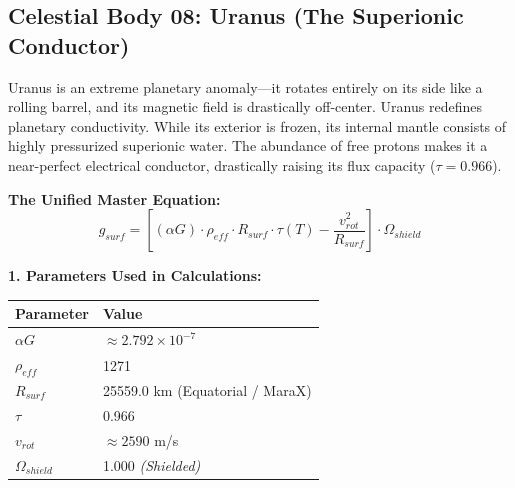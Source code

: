 \documentclass[11pt, a4paper]{article}
\begin{document}
\clearpage
\subsection{Celestial Body 08: Uranus (The Superionic Conductor)}
  Uranus is an extreme planetary anomaly—it rotates entirely on its side like a rolling barrel, and its magnetic field is drastically off-center. Uranus redefines planetary conductivity. While its exterior is frozen, its internal mantle consists of highly pressurized superionic water. The abundance of free protons makes it a near-perfect electrical conductor, drastically raising its flux capacity ($\tau = 0.966$).

  \vspace{0.5em}
  \noindent \textbf{The Unified Master Equation:}
  $$ g_{surf} = \left[ (\alpha G) \cdot \rho_{eff} \cdot R_{surf} \cdot \tau(T) - \frac{v_{rot}^2}{R_{surf}} \right] \cdot \Omega_{shield} $$

  \vspace{0.5em}
  \noindent \textbf{1. Parameters Used in Calculations:} \\[0.5em]
  \begingroup
  \renewcommand{\arraystretch}{1.3}
  \hspace*{2em}
  \begin{tabular}{|l|l|}
    \hline
    \textbf{Parameter} & \textbf{Value} \\ \hline
    $\alpha G$ & $\approx 2.792 \times 10^{-7}$ \\ \hline
    $\rho_{eff}$ & 1271 \\ \hline
    $R_{surf}$ & 25559.0 km (Equatorial / MaraX) \\ \hline
    $\tau$ & 0.966 \\ \hline
    $v_{rot}$ & $\approx 2590$ m/s \\ \hline
    $\Omega_{shield}$ & 1.000 \textit{(Shielded)} \\ \hline
  \end{tabular}
  \endgroup
\end{document}
